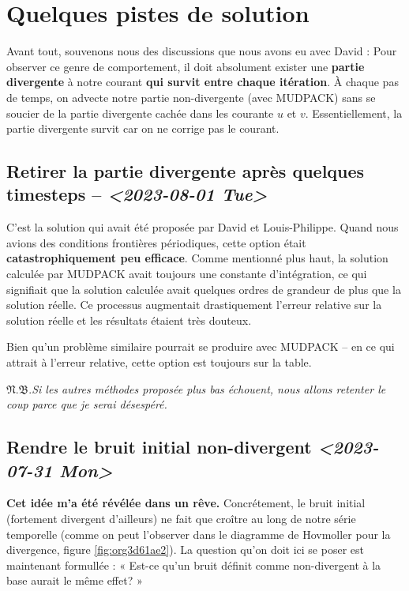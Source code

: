 \documentclass[10pt]{article}
\numberwithin{equation}{section}
\newcommand{\pt}{\hspace{1pt}} %
\newcommand{\nb}{\underline{{\footnotesize\EightStarConvex}\pt $\mathfrak{N.B.}$\vphantom{p}}\hspace{3pt}}
\begin{document}
\section{Quelques pistes de solution}
\label{sec:orgda1a0f7}
Avant tout, souvenons nous des discussions que nous avons eu avec David : 
Pour observer ce genre de comportement, il doit absolument exister une \textbf{partie divergente} à notre courant \textbf{qui survit entre chaque itération}.
À chaque pas de temps, on advecte notre partie non-divergente (avec MUDPACK) sans se soucier de la partie divergente cachée dans les courante \(u\) et \(v\).
Essentiellement, la partie divergente survit car on ne corrige pas le courant.


\subsection{Retirer la partie divergente après quelques timesteps -- \textit{<2023-08-01 Tue>}}
\label{sec:orgbb81d3d}
C'est la solution qui avait été proposée par David et Louis-Philippe.
Quand nous avions des conditions frontières périodiques, cette option était \textbf{catastrophiquement peu efficace}.
Comme mentionné plus haut, la solution calculée par MUDPACK avait toujours une constante d'intégration, ce qui signifiait que la solution calculée avait quelques ordres de grandeur de plus que la solution réelle.
Ce processus augmentait drastiquement l'erreur relative sur la solution réelle et les résultats étaient très douteux.\bigskip

Bien qu'un problème similaire pourrait se produire avec MUDPACK -- en ce qui attrait à l'erreur relative, cette option est toujours sur la table.\bigskip

\nb \emph{Si les autres méthodes proposée plus bas échouent, nous allons retenter le coup parce que je serai désespéré.}

\subsection{Rendre le bruit initial non-divergent \textit{<2023-07-31 Mon>}}
\label{sec:org43d70ad}
\textbf{Cet idée m'a été révélée dans un rêve.}
Concrétement, le bruit initial (fortement divergent d'ailleurs) ne fait que croître au long de notre série temporelle (comme on peut l'observer dans le diagramme de Hovmoller pour la divergence, figure \ref{fig:org3d61ae2}).
La question qu'on doit ici se poser est maintenant formullée : « Est-ce qu'un bruit définit comme non-divergent à la base aurait le même effet? »\bigskip
\end{document}
